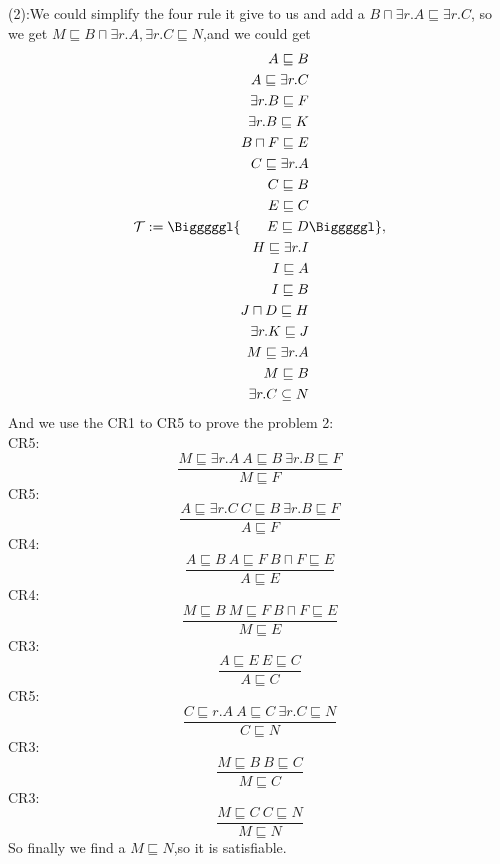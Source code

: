 \documentclass{article}
\begin{document}
    (2):We could simplify the four rule it give to us and add a $B\sqcap\exists r.A\sqsubseteq\exists r.C$,
    so we get $M\sqsubseteq B\sqcap\exists r.A,\exists r.C \sqsubseteq N$,and we could get\\
    \begin{equation*}
        \mathcal{T}:=\Bigggggl\{
        \begin{aligned} 
        A \sqsubseteq B\\
        A \sqsubseteq \exists r.C\\
        \exists r.B \sqsubseteq F\\
        \exists r.B \sqsubseteq K\\
        B \sqcap F \sqsubseteq E\\
        C \sqsubseteq \exists r.A \\
        C \sqsubseteq B\\
        E \sqsubseteq C\\
        E \sqsubseteq D\\
        H \sqsubseteq \exists r.I\\
        I \sqsubseteq A\\
        I \sqsubseteq B\\
        J \sqcap D\sqsubseteq H\\
        \exists r.K \sqsubseteq J\\
        M \sqsubseteq \exists r.A\\
        M \sqsubseteq B\\
        \exists r.C \subseteq N
        \end{aligned}
        \Bigggggl\},
    \end{equation*}
    And we use the CR1 to CR5 to prove the problem 2:\\
    CR5:\[\frac{M\sqsubseteq \exists r.A\ A\sqsubseteq B\ \exists r.B \sqsubseteq F}{M\sqsubseteq F}\]
    CR5:\[\frac{A\sqsubseteq \exists r.C\ C\sqsubseteq B\ \exists r.B \sqsubseteq F}{A\sqsubseteq F}\]
    CR4:\[\frac{A\sqsubseteq B\ A\sqsubseteq F\ B\sqcap F\sqsubseteq E}{A\sqsubseteq E}\]
    CR4:\[\frac{M\sqsubseteq B\ M\sqsubseteq F\ B\sqcap F\sqsubseteq E}{M\sqsubseteq E}\]
    CR3:\[\frac{A\sqsubseteq E\ E\sqsubseteq C}{A\sqsubseteq C}\]
    CR5:\[\frac{C\sqsubseteq r.A\ A\sqsubseteq C\ \exists r.C\sqsubseteq N}{C\sqsubseteq N}\]
    CR3:\[\frac{M\sqsubseteq B\ B\sqsubseteq C}{M\sqsubseteq C}\]
    CR3:\[\frac{M\sqsubseteq C\ C\sqsubseteq N}{M\sqsubseteq N}\]
    So finally we find a $M\sqsubseteq N$,so it is satisfiable.\\
\end{document}

